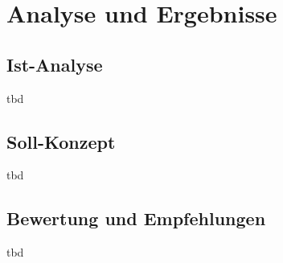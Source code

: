 \section{Analyse und Ergebnisse}
\label{sec:analyse}

\subsection{Ist-Analyse}
\label{subsec:ist}
tbd

\subsection{Soll-Konzept}
\label{subsec:soll}
tbd

\subsection{Bewertung und Empfehlungen}
\label{subsec:bewertung}
tbd
